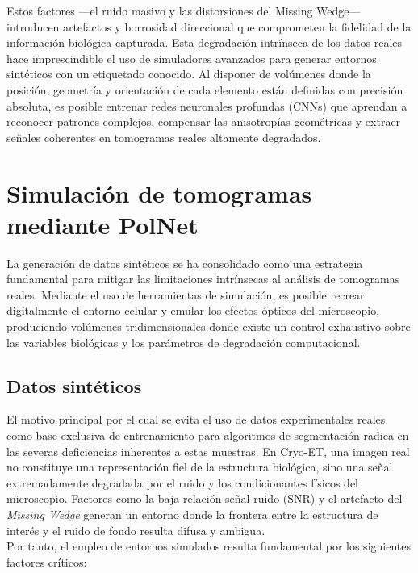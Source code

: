 Estos factores —el ruido masivo y las distorsiones del Missing Wedge— introducen artefactos y borrosidad direccional que comprometen la fidelidad de la información biológica capturada. Esta degradación intrínseca de los datos reales hace imprescindible el uso de simuladores avanzados para generar entornos sintéticos con un etiquetado conocido. Al disponer de volúmenes donde la posición, geometría y orientación de cada elemento están definidas con precisión absoluta, es posible entrenar redes neuronales profundas (CNNs) que aprendan a reconocer patrones complejos, compensar las anisotropías geométricas y extraer señales coherentes en tomogramas reales altamente degradados.

\section{Simulación de tomogramas mediante PolNet}
La generación de datos sintéticos se ha consolidado como una estrategia fundamental para mitigar las limitaciones intrínsecas al análisis de tomogramas reales. Mediante el uso de herramientas de simulación, es posible recrear digitalmente el entorno celular y emular los efectos ópticos del microscopio, produciendo volúmenes tridimensionales donde existe un control exhaustivo sobre las variables biológicas y los parámetros de degradación computacional.

\subsection{Datos sintéticos}
El motivo principal por el cual se evita el uso de datos experimentales reales como base exclusiva de entrenamiento para algoritmos de segmentación radica en las severas deficiencias inherentes a estas muestras. En Cryo-ET, una imagen real no constituye una representación fiel de la estructura biológica, sino una señal extremadamente degradada por el ruido y los condicionantes físicos del microscopio. Factores como la baja relación señal-ruido (SNR) y el artefacto del \textit{Missing Wedge} generan un entorno donde la frontera entre la estructura de interés y el ruido de fondo resulta difusa y ambigua.\\

Por tanto, el empleo de entornos simulados resulta fundamental por los siguientes factores críticos:

